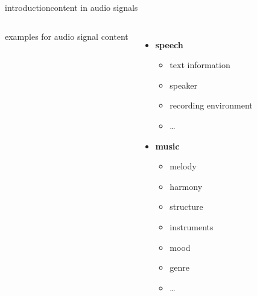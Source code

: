         \begin{frame}{introduction}{content in audio signals}
             \begin{columns}
                examples for audio signal content
                \begin{itemize}
                    \item   \textbf{speech}
                        \begin{itemize}
                            \item   text information
                            \item   speaker
                            \item   recording environment
                            \item   \dots
                        \end{itemize}
                    \item   \textbf{music}
                        \begin{itemize}
                            \item   melody
                            \item   harmony
                            \item   structure
                            \item   instruments
                            \item   mood
                            \item   genre
                            \item   \dots
                        \end{itemize}
                \end{itemize}
             \end{columns}
        \end{frame}

